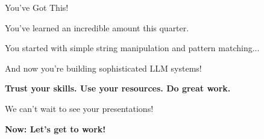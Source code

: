\documentclass[aspectratio=169]{beamer}
\begin{document}
\begin{frame}{You've Got This! 💪}
\begin{center}
\Large{You've learned an incredible amount this quarter.}

\vspace{0.3cm}

You started with simple string manipulation and pattern matching...

\vspace{0.3cm}

And now you're building sophisticated LLM systems!

\vspace{0.3cm}

\textbf{Trust your skills. Use your resources. Do great work.}

\vspace{0.5cm}

\large{We can't wait to see your presentations! 🎉}

\vspace{0.5cm}

\textbf{Now: Let's get to work! 🚀}
\end{center}
\end{frame}
\end{document}
